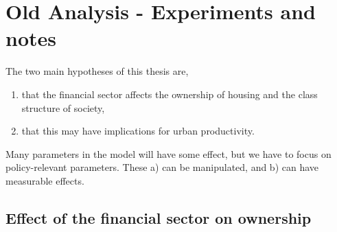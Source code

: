\chapter{Old Analysis - Experiments and notes}
The two main hypotheses of this thesis are, 
\begin{enumerate}
 \item that the financial sector affects the ownership of housing and the class structure of society, 
    \item that this may have implications for urban productivity. 
\end{enumerate} 
Many parameters in the model will have some effect, but we have to focus on policy-relevant parameters. These a) can be manipulated, and b) can have measurable effects.


\section{Effect of the financial sector on ownership} 
